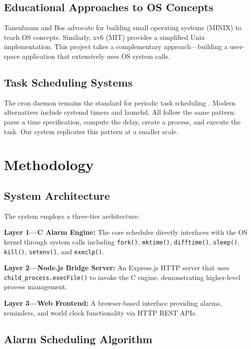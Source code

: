 \documentclass[conference]{IEEEtran}
\begin{document}
\subsection{Educational Approaches to OS Concepts}

Tanenbaum and Bos \cite{tanenbaum2015} advocate for building small operating systems (MINIX) to teach OS concepts. Similarly, xv6 (MIT) \cite{cox2019} provides a simplified Unix implementation. This project takes a complementary approach---building a user-space application that extensively uses OS system calls.

\subsection{Task Scheduling Systems}

The cron daemon remains the standard for periodic task scheduling \cite{ieee2017}. Modern alternatives include systemd timers and launchd. All follow the same pattern: parse a time specification, compute the delay, create a process, and execute the task. Our system replicates this pattern at a smaller scale.

\section{Methodology}

\subsection{System Architecture}

The system employs a three-tier architecture:

\textbf{Layer 1---C Alarm Engine:} The core scheduler directly interfaces with the OS kernel through system calls including \texttt{fork()}, \texttt{mktime()}, \texttt{difftime()}, \texttt{sleep()}, \texttt{kill()}, \texttt{setenv()}, and \texttt{execlp()}.

\textbf{Layer 2---Node.js Bridge Server:} An Express.js HTTP server that uses \texttt{child\_process.execFile()} to invoke the C engine, demonstrating higher-level process management.

\textbf{Layer 3---Web Frontend:} A browser-based interface providing alarms, reminders, and world clock functionality via HTTP REST APIs.

\subsection{Alarm Scheduling Algorithm}
\end{document}
